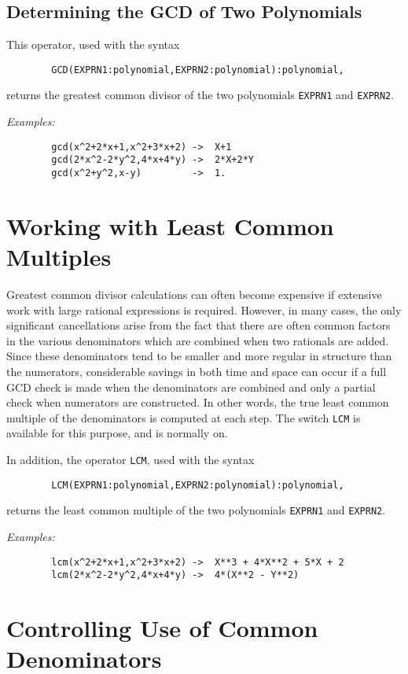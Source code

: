 \subsection{Determining the GCD of Two Polynomials}
This operator, used with the syntax
\begin{verbatim}
        GCD(EXPRN1:polynomial,EXPRN2:polynomial):polynomial,
\end{verbatim}
returns the greatest common divisor of the two polynomials {\tt EXPRN1} and
{\tt EXPRN2}.

{\it Examples:}
\begin{verbatim}
        gcd(x^2+2*x+1,x^2+3*x+2) ->  X+1
        gcd(2*x^2-2*y^2,4*x+4*y) ->  2*X+2*Y
        gcd(x^2+y^2,x-y)         ->  1.
\end{verbatim}

\section{Working with Least Common Multiples}

Greatest common divisor calculations can often become expensive if
extensive work with large rational expressions is required. However, in
many cases, the only significant cancellations arise from the fact that
there are often common factors in the various denominators which are
combined when two rationals are added. Since these denominators tend to be
smaller and more regular in structure than the numerators, considerable
savings in both time and space can occur if a full GCD check is made when
the denominators are combined and only a partial check when numerators are
constructed. In other words, the true least common multiple of the
denominators is computed at each step. The switch {\tt LCM}
is available for this purpose, and is normally on.

In addition, the operator {\tt LCM}, used with the syntax
\begin{verbatim}
        LCM(EXPRN1:polynomial,EXPRN2:polynomial):polynomial,
\end{verbatim}
returns the least common multiple of the two polynomials {\tt EXPRN1} and
{\tt EXPRN2}.

{\it Examples:}
\begin{verbatim}
        lcm(x^2+2*x+1,x^2+3*x+2) ->  X**3 + 4*X**2 + 5*X + 2
        lcm(2*x^2-2*y^2,4*x+4*y) ->  4*(X**2 - Y**2)
\end{verbatim}

\section{Controlling Use of Common Denominators}


